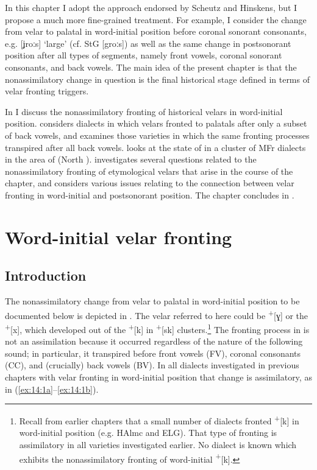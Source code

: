 In this chapter I adopt the  approach endorsed by Scheutz and Hinskens, but I propose a much more fine-grained treatment. For example, I consider the change from velar to palatal in word-initial position before coronal sonorant consonants, e.g. [ʝroːs] ‘large’ (cf. StG [groːs]) as well as the same change in postsonorant position after all types of segments, namely front vowels, coronal sonorant consonants, and back vowels. The main idea of the present chapter is that the nonassimilatory change in question is the final historical stage defined in terms of velar fronting triggers.

In  I discuss the nonassimilatory fronting of historical velars in word-initial position.  considers dialects in which velars fronted to palatals after only a subset of back vowels, and  examines those varieties in which the same fronting processes transpired after all back vowels.  looks at the state of  in a cluster of MFr dialects in the area of  (North ).  investigates several questions related to the nonassimilatory fronting of etymological velars that arise in the course of the chapter, and  considers various issues relating to the connection between velar fronting in word-initial and postsonorant position. The chapter concludes in .

\section{{Word-initial} {velar} {fronting}}\label{sec:14.2}

\subsection{Introduction}\label{sec:14.2.1}

The nonassimilatory change from velar to palatal in word-initial position to be documented below is depicted in . The velar referred to here could be  \textsuperscript{+}[ɣ] or the \textsuperscript{+}[x], which developed out of the \textsuperscript{+}[k] in  \textsuperscript{+}[sk] clusters.\footnote{{Recall from earlier chapters that a small number of dialects fronted } \textrm{\textsuperscript{+}}\textrm{[k] in word-initial position (e.g. HAlmc and ELG). That type of fronting is assimilatory in all varieties investigated earlier. No dialect is known which exhibits the nonassimilatory fronting of word-initial } \textrm{\textsuperscript{+}}\textrm{[k].} } The fronting process in  is not an assimilation because it occurred regardless of the nature of the following sound; in particular, it transpired before front vowels (FV), coronal consonants (CC), and (crucially) back vowels (BV). In all dialects investigated in previous chapters with velar fronting in word-initial position that change is assimilatory, as in (\ref{ex:14:1a}--\ref{ex:14:1b}).

